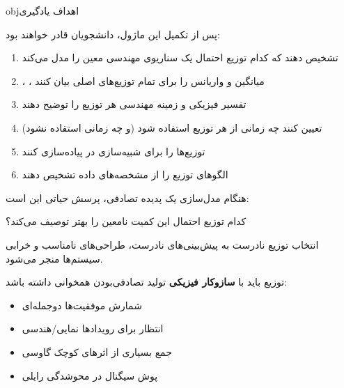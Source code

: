 \begin{PSbox}[unbreakable]{obj}{اهداف یادگیری}

پس از تکمیل این ماژول، دانشجویان قادر خواهند بود:

\begin{enumerate}
\def\labelenumi{\arabic{enumi}.}
\tightlist
\item
  تشخیص دهند که کدام توزیع احتمال یک سناریوی مهندسی معین را مدل می‌کند
\item
  ، ، میانگین و واریانس را برای تمام توزیع‌های اصلی بیان کنند
\item
  تفسیر فیزیکی و زمینه مهندسی هر توزیع را توضیح دهند
\item
  تعیین کنند چه زمانی از هر توزیع استفاده شود (و چه زمانی استفاده نشود)
\item
  توزیع‌ها را برای شبیه‌سازی در  پیاده‌سازی کنند
\item
  الگوهای توزیع را از مشخصه‌های داده تشخیص دهند
\end{enumerate}

\end{PSbox}



هنگام مدل‌سازی یک پدیده تصادفی، پرسش حیاتی این است:

\begin{PSquote}

کدام توزیع احتمال این کمیت نامعین را بهتر توصیف می‌کند؟

\end{PSquote}

انتخاب توزیع نادرست به پیش‌بینی‌های نادرست، طراحی‌های نامناسب و خرابی سیستم‌ها منجر می‌شود.


توزیع باید با \textbf{سازوکار فیزیکی} تولید تصادفی‌بودن همخوانی داشته باشد:

\begin{itemize}
\tightlist
\item
  شمارش موفقیت‌ها \lr{\ensuremath{\to}} دوجمله‌ای
\item
  انتظار برای رویدادها \lr{\ensuremath{\to}} نمایی/هندسی
\item
  جمع بسیاری از اثرهای کوچک \lr{\ensuremath{\to}} گاوسی
\item
  پوش سیگنال در محوشدگی \lr{\ensuremath{\to}} رایلی
\end{itemize}

